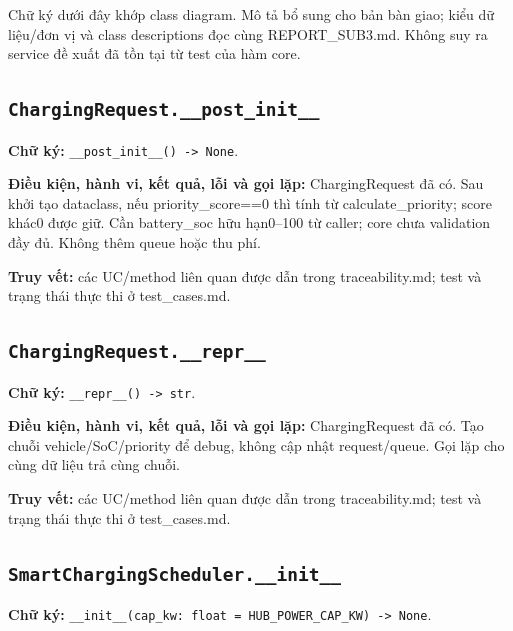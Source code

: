 \documentclass[11pt,a4paper]{article}
\begin{document}
Chữ ký dưới đây khớp class diagram. Mô tả bổ sung cho bản bàn giao; kiểu
dữ liệu/đơn vị và class descriptions đọc cùng REPORT\_SUB3.md. Không suy
ra service đề xuất đã tồn tại từ test của hàm core.

\hypertarget{chargingrequest.__post_init__}{%
\subsection{\texorpdfstring{\texttt{ChargingRequest.\_\_post\_init\_\_}}{ChargingRequest.\_\_post\_init\_\_}}\label{chargingrequest.__post_init__}}

\textbf{Chữ ký:} \texttt{\_\_post\_init\_\_()\ -\textgreater{}\ None}.

\textbf{Điều kiện, hành vi, kết quả, lỗi và gọi lặp:} ChargingRequest đã
có. Sau khởi tạo dataclass, nếu priority\_score==0 thì tính từ
calculate\_priority; score khác0 được giữ. Cần battery\_soc hữu
hạn0--100 từ caller; core chưa validation đầy đủ. Không thêm queue hoặc
thu phí.

\textbf{Truy vết:} các UC/method liên quan được dẫn trong
traceability.md; test và trạng thái thực thi ở test\_cases.md.

\hypertarget{chargingrequest.__repr__}{%
\subsection{\texorpdfstring{\texttt{ChargingRequest.\_\_repr\_\_}}{ChargingRequest.\_\_repr\_\_}}\label{chargingrequest.__repr__}}

\textbf{Chữ ký:} \texttt{\_\_repr\_\_()\ -\textgreater{}\ str}.

\textbf{Điều kiện, hành vi, kết quả, lỗi và gọi lặp:} ChargingRequest đã
có. Tạo chuỗi vehicle/SoC/priority để debug, không cập nhật
request/queue. Gọi lặp cho cùng dữ liệu trả cùng chuỗi.

\textbf{Truy vết:} các UC/method liên quan được dẫn trong
traceability.md; test và trạng thái thực thi ở test\_cases.md.

\hypertarget{smartchargingscheduler.__init__}{%
\subsection{\texorpdfstring{\texttt{SmartChargingScheduler.\_\_init\_\_}}{SmartChargingScheduler.\_\_init\_\_}}\label{smartchargingscheduler.__init__}}

\textbf{Chữ ký:}
\texttt{\_\_init\_\_(cap\_kw:\ float\ =\ HUB\_POWER\_CAP\_KW)\ -\textgreater{}\ None}.
\end{document}
